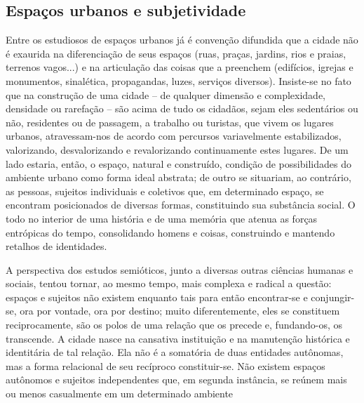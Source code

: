 \vspace*{-1.6mm}
{\noindent\fontsize{9}{10.8}\selectfont{Recebido em: 01/2015;
Aceito em: 03/2015.}}
\begin{multicols}{2}
\section*{Espaços urbanos e subjetividade}
\par{}Entre os estudiosos de espaços urbanos já é convenção difundida que a cidade não é exaurida na diferenciação de seus espaços (\allowbreak{}ruas,\allowbreak{} praças,\allowbreak{} jardins,\allowbreak{} rios e praias,\allowbreak{} terrenos vagos.\allowbreak{}.\allowbreak{}.\allowbreak{})\allowbreak{} e na articulação das coisas que a preenchem (\allowbreak{}edifícios,\allowbreak{} igrejas e monumentos,\allowbreak{} sinalética,\allowbreak{} propagandas,\allowbreak{} luzes,\allowbreak{} serviços diversos)\allowbreak{}.\allowbreak{} Insiste-\allowbreak{}se no fato que na construção de uma cidade – de qualquer dimensão e complexidade,\allowbreak{} densidade ou rarefação – são acima de tudo os cidadãos,\allowbreak{} sejam eles sedentários ou não,\allowbreak{} residentes ou de passagem,\allowbreak{} a trabalho ou turistas,\allowbreak{} que vivem os lugares urbanos,\allowbreak{} atravessam-\allowbreak{}nos de acordo com percursos variavelmente estabilizados,\allowbreak{} valorizando,\allowbreak{} desvalorizando e revalorizando continuamente estes lugares.\allowbreak{} De um lado estaria,\allowbreak{} então,\allowbreak{} o espaço,\allowbreak{} natural e construído,\allowbreak{} condição de possibilidades do ambiente urbano como forma ideal abstrata; de outro se situariam,\allowbreak{} ao contrário,\allowbreak{} as pessoas,\allowbreak{} sujeitos individuais e coletivos que,\allowbreak{} em determinado espaço,\allowbreak{} se encontram posicionados de diversas formas,\allowbreak{} constituindo sua substância social.\allowbreak{} O todo no interior de uma história e de uma memória que atenua as forças entrópicas do tempo,\allowbreak{} consolidando homens e coisas,\allowbreak{} construindo e mantendo retalhos de identidades.\allowbreak{}\par{}A perspectiva dos estudos semióticos,\allowbreak{} junto a diversas outras ciências humanas e sociais,\allowbreak{} tentou tornar,\allowbreak{} ao mesmo tempo,\allowbreak{} mais complexa e radical a questão:\allowbreak{} espaços e sujeitos não existem enquanto tais para então encontrar-\allowbreak{}se e conjungir-\allowbreak{}se,\allowbreak{} ora por vontade,\allowbreak{} ora por destino; muito diferentemente,\allowbreak{} eles se constituem reciprocamente,\allowbreak{} são os polos de uma relação que os precede e,\allowbreak{} fundando-\allowbreak{}os,\allowbreak{} os transcende.\allowbreak{} A cidade nasce na cansativa instituição e na manutenção histórica e identitária de tal relação.\allowbreak{} Ela não é a somatória de duas entidades autônomas,\allowbreak{} mas a forma relacional de seu recíproco constituir-\allowbreak{}se.\allowbreak{} Não existem espaços autônomos e sujeitos independentes que,\allowbreak{} em segunda instância,\allowbreak{} se reúnem mais ou menos casualmente em um determinado ambiente 
\end{multicols}
